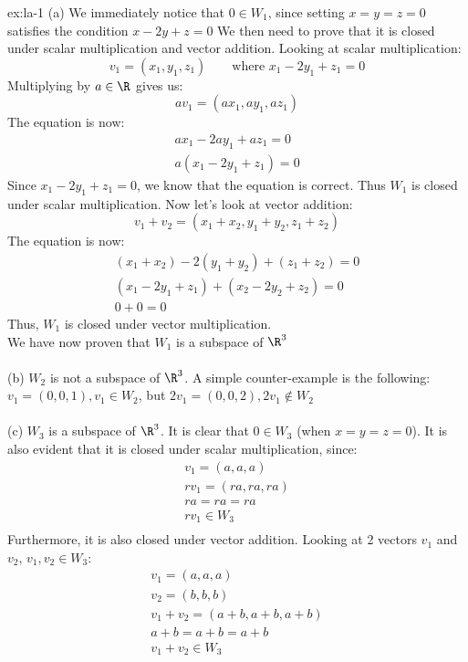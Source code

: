 
\begin{solution}{ex:la-1}
  (a)
  We immediately notice that $0 \in W_1$, since setting $x=y=z=0$ satisfies the condition $x-2y+z=0$
  We then need to prove that it is closed under scalar multiplication and vector addition.
  Looking at scalar multiplication:
  \[
    v_1=(x_1,y_1,z_1) \qquad \text{where } x_1-2y_1+z_1=0
  \]
  Multiplying by $a\in\R$ gives us:
  \[
    av_1=(ax_1,ay_1,az_1)
  \]
  The equation is now:
  \[
    \begin{aligned}
    ax_1-2ay_1+az_1=0\\
    a(x_1-2y_1+z_1)=0
    \end{aligned}
  \]
  Since $x_1-2y_1+z_1=0$, we know that the equation is correct. Thus $W_1$ is closed under scalar multiplication. Now let's look at vector addition:
  \[
    v_1+v_2=(x_1+x_2,y_1+y_2,z_1+z_2)
  \]
  The equation is now:
  \[
    \begin{aligned}
      (x_1+x_2)-2(y_1+y_2)+(z_1+z_2)=0\\
      (x_1-2y_1+z_1)+(x_2-2y_2+z_2)=0\\
      0+0=0
    \end{aligned}
  \]
  Thus, $W_1$ is closed under vector multiplication.\\
  We have now proven that $W_1$ is a subspace of $\R^3$\\\\
  (b)
  $W_2$ is not a subspace of $\R^3$. A simple counter-example is the following: $v_1=(0,0,1), v_1\in W_2$, but $2v_1=(0,0,2), 2v_1 \notin W_2$\\\\
  (c)
  $W_3$ is a subspace of $\R^3$. It is clear that $0\in W_3$ (when $x=y=z=0$). It is also evident that it is closed under scalar multiplication, since:
  \begin{gather*}
    v_1=(a,a,a)\\
    rv_1=(ra,ra,ra)\\
    ra=ra=ra\\
    rv_1\in W_3\\
  \end{gather*}
  Furthermore, it is also closed under vector addition. Looking at 2 vectors $v_1$ and $v_2$, $v_1, v_2 \in W_3$:
  \begin{gather*}
    v_1=(a,a,a)\\
    v_2=(b,b,b)\\
    v_1+v_2=(a+b,a+b,a+b)\\
    a+b=a+b=a+b\\
    v_1+v_2\in W_3
  \end{gather*}\\


\end{solution}

